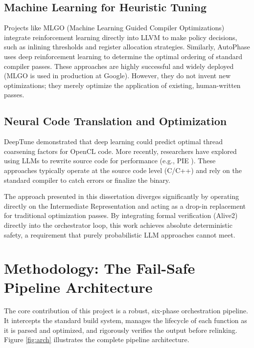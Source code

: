 \documentclass[conference,10pt]{IEEEtran}
\begin{document}
\subsection{Machine Learning for Heuristic Tuning}
Projects like MLGO (Machine Learning Guided Compiler Optimizations) \cite{trofin2021mlgo} integrate reinforcement learning directly into LLVM to make policy decisions, such as inlining thresholds and register allocation strategies. Similarly, AutoPhase \cite{haj2020autophase} uses deep reinforcement learning to determine the optimal ordering of standard compiler passes. These approaches are highly successful and widely deployed (MLGO is used in production at Google). However, they do not invent new optimizations; they merely optimize the application of existing, human-written passes.

\subsection{Neural Code Translation and Optimization}
DeepTune \cite{cummins2017end} demonstrated that deep learning could predict optimal thread coarsening factors for OpenCL code. More recently, researchers have explored using LLMs to rewrite source code for performance (e.g., PIE \cite{roziere2020pie}). These approaches typically operate at the source code level (C/C++) and rely on the standard compiler to catch errors or finalize the binary.

The approach presented in this dissertation diverges significantly by operating directly on the Intermediate Representation and acting as a drop-in replacement for traditional optimization passes. By integrating formal verification (Alive2) directly into the orchestrator loop, this work achieves absolute deterministic safety, a requirement that purely probabilistic LLM approaches cannot meet.

\section{Methodology: The Fail-Safe Pipeline Architecture}

The core contribution of this project is a robust, six-phase orchestration pipeline. It intercepts the standard build system, manages the lifecycle of each function as it is parsed and optimized, and rigorously verifies the output before relinking. Figure \ref{fig:arch} illustrates the complete pipeline architecture.
\end{document}
